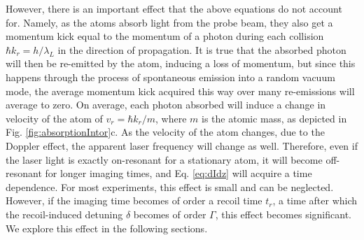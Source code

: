 However, there is an important effect that the above equations do not account for. Namely, as the atoms absorb light from the probe beam, they also get a momentum kick equal to the momentum of a photon during each collision $\hbar k_r=h/\lambda_L$ in the direction of propagation. It is true that the absorbed photon will then be re-emitted by the atom, inducing a loss of momentum, but since this happens through the process of spontaneous emission into a random vacuum mode, the average momentum kick acquired this way over many re-emissions will average to zero. On average, each photon absorbed will induce a change in velocity of the atom of $v_r=\hbar k_r/m$, where $m$ is the atomic mass, as depicted in Fig. \ref{fig:absorptionIntor}c. As the velocity of the atom changes, due to the Doppler effect, the apparent laser frequency will change as well. Therefore, even if the laser light is exactly on-resonant for a stationary atom, it will become off-resonant for longer imaging times, and Eq. \ref{eq:dIdz} will acquire a time dependence. For most experiments, this effect is small and can be neglected. However, if the imaging time becomes of order a recoil time $t_r$, a time after which the recoil-induced detuning $\delta$ becomes of order $\Gamma$, this effect becomes significant. We explore this effect in the following sections.  

